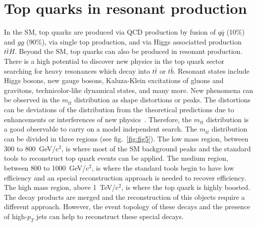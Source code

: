 \documentclass{cimento}
\begin{document}
\section{Top quarks in resonant production}
\label{sec:Resonances}

In the SM, top quarks are produced via QCD production by fusion of $q\bar{q}$ (10\%) and
$gg$ (90\%), via single top production, and via Higgs associatted production $t\bar{t}H$.
Beyond the SM, top quarks can also be produced in resonant production. There is
a high potential to discover new physics in the top quark sector searching for
heavy resonances which decay into $t\bar{t}$ or $t\bar{b}$. Resonant states 
include Higgs bosons, new gauge bosons, Kaluza-Klein excitations of gluons and
gravitons, technicolor-like dynamical states, and many more. New phenomena can
be observed in the $m_{t\bar{t}}$ distribution as shape distortions or peaks. The distortions
can be deviations of the distribution from the theoretical predictions due to enhancements
or interferences of new physics~\cite{ref:Maltoni}. Therefore, the $m_{t\bar{t}}$
distribution is a good observable to carry on a model independent search. The
$m_{t\bar{t}}$ distribution can be divided in three regions (see fig.~\ref{fig:fig5}). The low mass region, 
between 300 to 800~GeV/c$^2$, is where most of the SM background peaks and the
standard tools to reconstruct top quark events can be applied. The medium region,
between 800 to 1000~GeV/c$^2$, is where the standard tools begin to have low efficiency
and an special reconstruction approach is needed to recover efficiency. The high
mass region, above 1~TeV/c$^2$, is where the top quark is highly boosted. The decay
products are merged and the reconstruction of this objects require a different approach.
However, the event topology of these decays and the presence of high-$p_T$ jets can help
to reconstruct these special decays.
\end{document}

